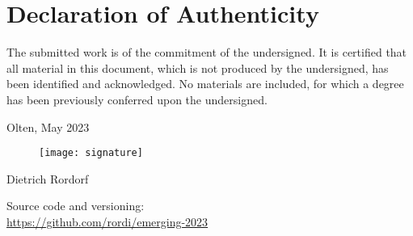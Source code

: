 \vspace*{3cm}

\section*{Declaration of Authenticity}

The submitted work is of the commitment of the undersigned. It is certified that all material
in this document, which is not produced by the undersigned, has been identified and acknowledged.
No materials are included, for which a degree has been previously conferred upon the undersigned.

\vspace*{1cm} 
\noindent Olten, May 2023

\begin{figure}[h!]
    \texttt{[image: signature]}
\end{figure}
\noindent Dietrich Rordorf

\vspace*{2cm} 

\noindent Source code and versioning:\\
\url{https://github.com/rordi/emerging-2023}

